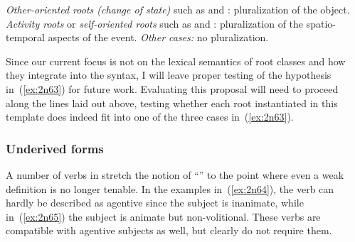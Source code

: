 \begin{exe}
\begin{xlist}
\begin{exe}
\begin{xlist}
\begin{exe}
\begin{xlist}
\begin{exe}
\begin{exe}
\begin{xlist}
\begin{exe}
\begin{xlist}
\begin{exe}
\begin{xlist}
\begin{exe}
\begin{xlist}
\begin{exe}
\begin{xlist}
\begin{exe}
\begin{xlist}
\begin{exe}
\begin{xlist}
\begin{exe}
\begin{xlist}
\begin{exe}
\begin{xlist}
\begin{exe}
\begin{xlist}
\begin{exe}
\begin{xlist}
\begin{exe}
\begin{xlist}
\begin{exe}
\begin{xlist}
\begin{exe}
\begin{exe}
\begin{xlist}
\begin{exe}
\begin{xlist}
\begin{exe}
\begin{xlist}
\begin{exe}
\begin{xlist}
\begin{exe}
\begin{xlist}
\begin{exe}
\begin{xlist}
\begin{exe}
\begin{xlist}
\begin{exe}
\begin{xlist}
\begin{xlist}
\begin{xlist}
\begin{exe}
\begin{xlist}
\begin{xlist}
\begin{xlist}
\begin{exe}
\begin{exe}
\begin{xlist}
\begin{exe}
\begin{xlist}
\begin{exe}
\begin{xlist}
\begin{exe}
\begin{xlist}
\begin{exe}
\begin{xlist}
\begin{exe}
\begin{xlist}
\begin{exe}
\begin{xlist}
\begin{exe}
\begin{exe}
\begin{xlist}
\begin{xlist}
\begin{exe}
\begin{xlist}
\begin{exe}
\begin{xlist}
\begin{exe}
\begin{xlist}
\begin{exe}
\begin{xlist}
\begin{exe}
\begin{xlist}
\begin{exe}
\begin{xlist}
\begin{exe}
\begin{exe}
\begin{xlist}
\begin{exe}
\begin{xlist}
\begin{exe}
\begin{xlist}
\begin{exe}
\begin{xlist}
\begin{exe}
\begin{xlist}
\begin{exe}
\begin{xlist}
 	\ex   \textit{Other-oriented roots (change of state)} such as  and : pluralization of the object. 
 	\ex   \textit{Activity roots} or \textit{self-oriented roots} such as  and : pluralization of the spatio-temporal aspects of the event. 
 	\ex   \textit{Other cases:} no pluralization. 
 \z
\z 

Since our current focus is not on the lexical semantics of root classes and how they integrate into the syntax, I will leave proper testing of the hypothesis in~(\ref{ex:2n63}) for future work. Evaluating this proposal will need to proceed along the lines laid out above, testing whether each root instantiated in this template does indeed fit into one of the three cases in~(\ref{ex:2n63}).

		\subsubsection{Underived forms} \label{voice:va:sem:underived}
A number of verbs in {\tpie} stretch the notion of ``'' to the point where even a weak definition is no longer tenable. In the examples in~(\ref{ex:2n64}), the verb can hardly be described as agentive since the subject is inanimate, while in~(\ref{ex:2n65}) the subject is animate but non-volitional. These verbs are compatible with agentive subjects as well, but clearly do not require them.
 \begin{exe}
 \ex  \label{ex:2n64}
 \begin{xlist} 
  
    
\end{xlist}
\end{exe}
\end{xlist}
\end{exe}
\end{xlist}
\end{exe}
\end{xlist}
\end{exe}
\end{xlist}
\end{exe}
\end{xlist}
\end{exe}
\end{xlist}
\end{exe}
\end{exe}
\end{xlist}
\end{exe}
\end{xlist}
\end{exe}
\end{xlist}
\end{exe}
\end{xlist}
\end{exe}
\end{xlist}
\end{exe}
\end{xlist}
\end{exe}
\end{xlist}
\end{xlist}
\end{exe}
\end{exe}
\end{xlist}
\end{exe}
\end{xlist}
\end{exe}
\end{xlist}
\end{exe}
\end{xlist}
\end{exe}
\end{xlist}
\end{exe}
\end{xlist}
\end{exe}
\end{xlist}
\end{exe}
\end{exe}
\end{xlist}
\end{xlist}
\end{xlist}
\end{exe}
\end{xlist}
\end{xlist}
\end{xlist}
\end{exe}
\end{xlist}
\end{exe}
\end{xlist}
\end{exe}
\end{xlist}
\end{exe}
\end{xlist}
\end{exe}
\end{xlist}
\end{exe}
\end{xlist}
\end{exe}
\end{xlist}
\end{exe}
\end{exe}
\end{xlist}
\end{exe}
\end{xlist}
\end{exe}
\end{xlist}
\end{exe}
\end{xlist}
\end{exe}
\end{xlist}
\end{exe}
\end{xlist}
\end{exe}
\end{xlist}
\end{exe}
\end{xlist}
\end{exe}
\end{xlist}
\end{exe}
\end{xlist}
\end{exe}
\end{xlist}
\end{exe}
\end{xlist}
\end{exe}
\end{xlist}
\end{exe}
\end{exe}
\end{xlist}
\end{exe}
\end{xlist}
\end{exe}
\end{xlist}
\end{exe}
